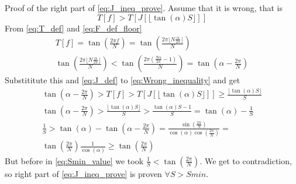 \documentclass{article}
\begin{document}
Proof of the right part of \eqref{eq:J_ineq_prove}. Assume that it is wrong, that is
\begin{equation}
\label{eq:Wrong_inequality}
T[f] > T[J[\lfloor \tan(\alpha) S \rfloor]]
\end{equation}
From \eqref{eq:T_def} and \eqref{eq:F_def_floor}
\begin{multline}
T[f] = \tan(\frac{2\pi f}{N}) = \tan(\frac{2\pi \lfloor N \frac{\alpha}{2 \pi} \rfloor}{N}) \\
\tan(\frac{2\pi \lfloor N \frac{\alpha}{2 \pi} \rfloor}{N}) <  \tan(\frac{2\pi (\frac{N \alpha}{2 \pi} - 1)}{N}) =
\tan(\alpha - \frac{2\pi}{N})
\end{multline}
Substititute this and \eqref{eq:J_def} to \eqref{eq:Wrong_inequality} and get
\begin{multline}
\tan(\alpha - \frac{2\pi}{N}) > T[f] > T[J[\lfloor \tan(\alpha) S \rfloor]] \ge \frac{\lfloor \tan(\alpha) S \rfloor}{S} \\
\tan(\alpha - \frac{2\pi}{N}) > \frac{\lfloor \tan(\alpha) S \rfloor}{S} > \frac{\tan(\alpha) S - 1}{S} = \tan(\alpha) - \frac{1}{S} \\
\frac{1}{S} > \tan(\alpha) - \tan(\alpha - \frac{2\pi}{N}) = \frac{\sin(\frac{2\pi}{N})}{\cos(\alpha)\cos(\frac{2\pi}{N})} = \\
  \tan(\frac{2\pi}{N}) \frac{1}{\cos(\alpha)} \ge \tan(\frac{2\pi}{N})
\end{multline}
But before in \eqref{eq:Smin_value} we took $\frac{1}{S} < \tan(\frac{2\pi}{N})$. We get to contradiction,
so right part of \eqref{eq:J_ineq_prove} is proven $\forall S > Smin$.
\end{document}
